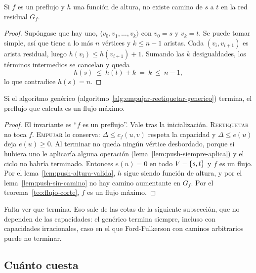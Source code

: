 \documentclass[11pt,letterpaper]{article}
\begin{document}
\begin{lema}
  \label{lem:push-sin-camino}
  Si $f$ es un preflujo y $h$ una función de altura, no existe camino
  de $s$ a $t$ en la red residual $G_f$.
\end{lema}

\begin{proof}
  Supóngase que hay uno, $\langle v_0, v_1, \dots, v_k\rangle$ con
  $v_0 = s$ y $v_k = t$. Se puede tomar simple, así que tiene a lo más
  $n$ vértices y $k \le n - 1$ aristas. Cada $(v_i, v_{i+1})$ es arista
  residual, luego $h(v_i) \le h(v_{i+1}) + 1$. Sumando las $k$
  desigualdades, los términos intermedios se cancelan y queda
  \[
    h(s) \ \le\ h(t) + k \ =\ k \ \le\ n - 1 ,
  \]
  lo que contradice $h(s) = n$.
\end{proof}

\begin{teorema}
  \label{teo:push-correccion}
  Si el algoritmo genérico
  (algoritmo~\ref{alg:empujar-reetiquetar-generico}) termina, el
  preflujo que calcula es un flujo máximo.
\end{teorema}

\begin{proof}
  El invariante es ``$f$ es un preflujo''. Vale tras la inicialización.
  \textsc{Reetiquetar} no toca $f$. \textsc{Empujar} lo conserva:
  $\Delta \le c_f(u, v)$ respeta la capacidad y $\Delta \le e(u)$ deja
  $e(u) \ge 0$. Al terminar no queda ningún vértice desbordado, porque
  si hubiera uno le aplicaría alguna operación
  (lema~\ref{lem:push-siempre-aplica}) y el ciclo no habría terminado.
  Entonces $e(u) = 0$ en todo $V - \left\{ s, t \right\}$ y $f$ es un flujo. Por
  el lema~\ref{lem:push-altura-valida}, $h$ sigue siendo función de
  altura, y por el lema~\ref{lem:push-sin-camino} no hay camino
  aumentante en $G_f$. Por el teorema~\ref{teo:flujo-corte}, $f$ es un
  flujo máximo.
\end{proof}

Falta ver que termina. Eso sale de las cotas de la siguiente
subsección, que no dependen de las capacidades: el genérico termina
siempre, incluso con capacidades irracionales, caso en el que
Ford-Fulkerson con caminos arbitrarios puede no terminar.


\subsection*{Cuánto cuesta}
\end{document}

